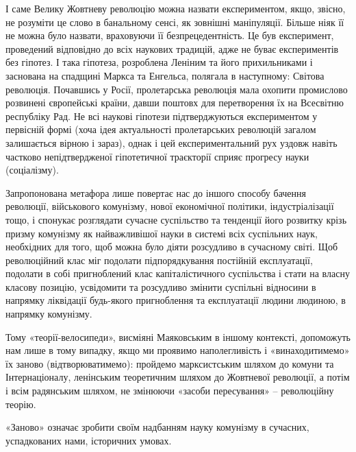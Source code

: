 \documentclass[../main]{subfiles}
\begin{document}
І саме Велику Жовтневу революцію можна назвати експериментом, якщо, звісно, не розуміти це слово в банальному сенсі, як зовнішні маніпуляції. Більше ніяк її не можна було назвати, враховуючи її безпрецедентність. Це був експеримент, проведений відповідно до всіх наукових традицій, адже не буває експериментів без гіпотез. І така гіпотеза, розроблена Леніним та його прихильниками і заснована на спадщині Маркса та Енгельса, полягала в наступному: Світова революція. Почавшись у Росії, пролетарська революція мала охопити промислово розвинені європейські країни, давши поштовх для перетворення їх на Всесвітню республіку Рад. Не всі наукові гіпотези підтверджуються експериментом у первісній формі (хоча ідея актуальності пролетарських революцій загалом залишається вірною і зараз), однак і цей експериментальний рух уздовж навіть частково непідтвердженої гіпотетичної траєкторії сприяє прогресу науки (соціалізму).

Запропонована метафора лише повертає нас до іншого способу бачення революції, військового комунізму, нової економічної політики, індустріалізації тощо, і спонукає розглядати сучасне суспільство та тенденції його розвитку крізь призму комунізму як найважливішої науки в системі всіх суспільних наук, необхідних для того, щоб можна було діяти розсудливо в сучасному світі. Щоб революційний клас міг подолати підпорядкування постійній експлуатації, подолати в собі пригноблений клас капіталістичного суспільства і стати на власну класову позицію, усвідомити та розсудливо змінити суспільні відносини в напрямку ліквідації будь-якого пригноблення та експлуатації людини людиною, в напрямку комунізму.

Тому «теорії-велосипеди», висміяні Маяковським в іншому контексті, допоможуть нам лише в тому випадку, якщо ми проявимо наполегливість і «винаходитимемо» їх заново (відтворюватимемо): пройдемо марксистським шляхом до комуни та Інтернаціоналу, ленінським теоретичним шляхом до Жовтневої революції, а потім і всім радянським шляхом, не змінюючи «засоби пересування» – революційну теорію.

«Заново» означає зробити своїм надбанням науку комунізму в сучасних, успадкованих нами, історичних умовах.
\end{document}
